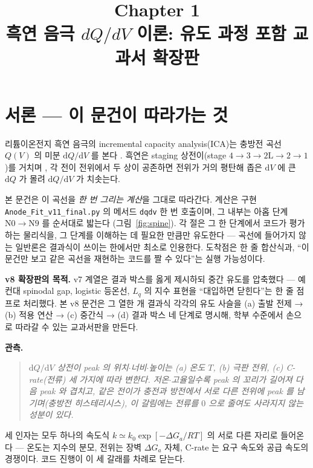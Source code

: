 \documentclass[11pt,a4paper]{article}
\title{\textbf{\LARGE Chapter 1}\\[0.35em]\Large 흑연 음극 $dQ/dV$ 이론: 유도 과정 포함 교과서 확장판}
\author{}
\date{}
\newcommand{\dd}{\mathrm{d}}
\newcommand{\code}[1]{\texttt{#1}}
\begin{document}
\maketitle

\section*{서론 — 이 문건이 따라가는 것}
리튬이온전지 흑연 음극의 incremental capacity analysis(ICA)는 충방전 곡선 $Q(V)$ 의 미분
$\dd Q/\dd V$ 를 본다 \cite{bloom2005,dubarry2012}. 흑연은 staging 상전이(stage
$4\!\to\!3\!\to\!2\mathrm L\!\to\!2\!\to\!1$)를 거치며 \cite{dahn1991,ohzuku1993}, 각 전이 전위에서
두 상이 공존하면 전위가 거의 평탄해 좁은 $\dd V$ 에 큰 $\dd Q$ 가 몰려 $\dd Q/\dd V$ 가 치솟는다.

본 문건은 이 곡선을 \emph{한 번 그리는 계산}을 그대로 따라간다. 계산은 구현 \code{Anode\_Fit\_v11\_final.py}
의 메서드 \code{dqdv} 한 번 호출이며, 그 내부는 아홉 단계 $\mathrm N0\!\to\!\mathrm N9$ 를 순서대로 밟는다
(그림~\ref{fig:spine}). 각 절은 그 한 단계에서 코드가 평가하는 물리식을, 그 단계를 이해하는 데 필요한 만큼만
유도한다 — 곡선에 들어가지 않는 일반론은 결과식이 쓰이는 한에서만 최소로 인용한다. 도착점은 한 줄 합산식과,
``이 문건만 보고 같은 곡선을 재현하는 코드를 짤 수 있다''는 실행 가능성이다.

\textbf{v8 확장판의 목적.} v7 계열은 결과 박스를 옳게 제시하되 중간 유도를 압축했다 — 예컨대
spinodal gap, logistic 등온선, $L_q$ 의 지수 표현을 ``대입하면 닫힌다''는 한 줄 점프로 처리했다.
본 v8 문건은 그 열한 개 결과식 각각의 유도 사슬을 (a) 출발 전제 → (b) 적용 연산 → (c) 중간식 →
(d) 결과 박스 네 단계로 명시해, 학부 수준에서 손으로 따라갈 수 있는 교과서판을 만든다.

\textbf{관측.}
\begin{quote}\itshape
$\dd Q/\dd V$ 상전이 peak 의 위치$\cdot$너비$\cdot$높이는 (a) 온도 $T$, (b) 극판 전위, (c) C-rate(전류)
세 가지에 따라 변한다. 저온$\cdot$고율일수록 peak 의 꼬리가 길어져 다음 peak 와 겹치고, 같은 전이가 충전과 방전에서
서로 다른 전위에 peak 를 남기며(충방전 히스테리시스), 이 갈림에는 전류를 $0$ 으로 줄여도 사라지지 않는 성분이 있다.
\end{quote}

세 인자는 모두 하나의 속도식 $k\simeq k_0\exp[-\Delta G_a/RT]$ 의 서로 다른 자리로 들어온다 — 온도는 지수의 분모,
전위는 장벽 $\Delta G_a$ 자체, C-rate 는 요구 속도와 공급 속도의 경쟁이다. 코드 진행이 이 세 갈래를 차례로 닫는다.
\end{document}
